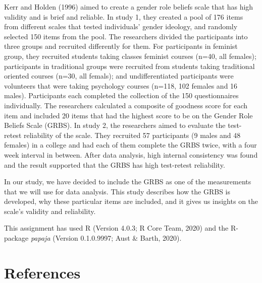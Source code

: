 \documentclass[
  english,
  man]{apa6}
\begin{document}
Kerr and Holden (1996) aimed to create a gender role beliefs scale that has high validity and is brief and reliable. In study 1, they created a pool of 176 items from different scales that tested individuals' gender ideology, and randomly selected 150 items from the pool. The researchers divided the participants into three groups and recruited differently for them. For participants in feminist group, they recruited students taking classes feminist courses (n=40, all females); participants in traditional groups were recruited from students taking traditional oriented courses (n=30, all femals); and undifferentiated participants were volunteers that were taking psychology courses (n=118, 102 females and 16 males). Participants each completed the collection of the 150 questionnaires individually. The researchers calculated a composite of goodness score for each item and included 20 items that had the highest score to be on the Gender Role Beliefs Scale (GRBS). In study 2, the researchers aimed to evaluate the test-retest reliability of the scale. They recruited 57 participants (9 males and 48 females) in a college and had each of them complete the GRBS twice, with a four week interval in between. After data analysis, high internal consistency was found and the result supported that the GRBS has high test-retest reliability.

In our study, we have decided to include the GRBS as one of the measurements that we will use for data analysis. This study describes how the GRBS is developed, why these particular items are included, and it gives us insights on the scale's validity and reliability.

\hfill\break
This assignment has used R (Version 4.0.3; R Core Team, 2020) and the R-package \emph{papaja} (Version 0.1.0.9997; Aust \& Barth, 2020).

\newpage

\hypertarget{references}{%
\section{References}\label{references}}

\begingroup
\setlength{\parindent}{-0.5in}
\setlength{\leftskip}{0.5in}
\end{document}
